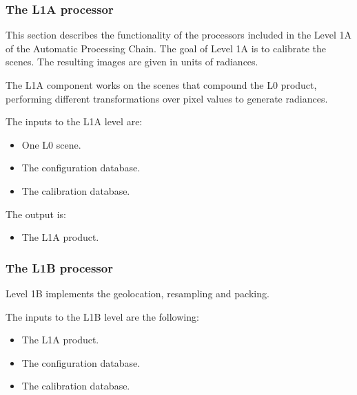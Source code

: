 \documentclass[a4paper]{article}
\newcommand\liststyleLFOxxxii{%
\renewcommand\labelitemi{[F0B7?]}
\renewcommand\labelitemii{o}
\renewcommand\labelitemiii{[F0B7?]}
\renewcommand\labelitemiv{[F0B7?]}
}
\begin{document}
\bigskip


\bigskip

\subsubsection[The L1A processor]{The L1A processor}
\hypertarget{Toc381777214}{}
\bigskip

This section describes the functionality of the processors included in
the Level 1A of the Automatic Processing Chain. The goal of Level 1A is
to calibrate the scenes. The resulting images are given in units of
radiances.\ 


\bigskip

The L1A component works on the scenes that compound the L0 product,
performing different transformations over pixel values to generate
radiances.


\bigskip

The inputs to the L1A level are:

\liststyleLFOxxxii
\begin{itemize}
\item One L0 scene.
\item The configuration database.
\item The calibration database.
\end{itemize}

\bigskip

The output is:

\liststyleLFOxxxii
\begin{itemize}
\item The L1A product.
\end{itemize}

\bigskip

\subsubsection[The L1B processor]{The L1B processor}
\hypertarget{Toc381777215}{}
\bigskip

Level 1B implements the geolocation, resampling and packing.


\bigskip

The inputs to the L1B level are the following:

\liststyleLFOxxxii
\begin{itemize}
\item The L1A product.
\item The configuration database.
\item The calibration database.
\end{itemize}
\end{document}
